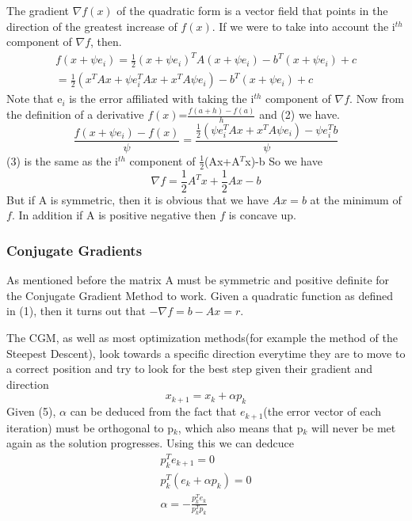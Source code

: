 \documentclass[12pt,a4paper]{article}
\begin{document}
The gradient $\nabla f(x)$ of the quadratic form is a vector field that points in the direction of the greatest increase of $f(x)$. If we were to take into account the i$^{th}$ component of $\nabla f$, then.
\begin{equation}
\begin{split}
f(x+\psi e_i)= \frac{1}{2} (x+\psi e_i)^TA(x+\psi e_i)-b^T(x+\psi e_i)+c\\
= \frac{1}{2} (x^TAx+\psi e^T_iAx +x^TA\psi e_i)-b^T(x+\psi e_i)+c
\end{split}
\end{equation}
Note that e$_i$ is the error affiliated with taking the i$^{th}$ component of $\nabla f$. Now from the definition of a derivative $f(x)$=$\frac{f(a+h)-f(a)}{h}$ and (2) we have.
\begin{equation}
\frac{f(x+\psi e_i)-f(x)}{\psi}=\frac{\frac{1}{2}(\psi e^T_iAx+x^TA\psi e_i)-\psi e^T_ib}{\psi}
\end{equation}
(3) is the same as the i$^{th}$ component of $\frac{1}{2}$(Ax+A$^T$x)-b
So we have
\begin{equation}
\nabla f =\frac{1}{2}A^Tx+\frac{1}{2}Ax-b
\end{equation}
But if A is symmetric, then it is obvious that we have $Ax=b$ at the minimum of $f$. In addition if A is positive negative then $f$ is concave up.
\subsubsection{Conjugate Gradients}
As mentioned before the matrix A must be symmetric and positive definite for the Conjugate Gradient Method to work. Given a quadratic function 
as defined in (1), then it turns out that $-\nabla f=b-Ax=r$.

The CGM, as well as most optimization methods(for example the method of the Steepest Descent\cite{rosenbloom1956method}), look towards a specific direction everytime they are to move to a correct position and try to look for the best step given their gradient and direction
\begin{equation}
x_{k+1} = x_k + \alpha p_k
\end{equation}
Given (5), $\alpha$ can be deduced from the fact that $e_{k+1}$(the error vector of each iteration) must be orthogonal to p$_k$,  which also means that p$_k$ will never be met again as the solution progresses. Using this we can dedcuce
\begin{equation}
\begin{split}
p^T_ke_{k+1}=0\\
p^T_k(e_k+\alpha p_k)=0\\
\alpha = -\frac{p^T_ke_k}{p^T_kp_k}
\end{split}
\end{equation}
\end{document}
